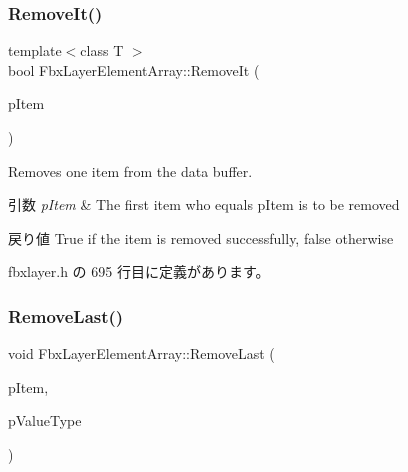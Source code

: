 \subsubsection{\texorpdfstring{Remove\+It()}{RemoveIt()}\hspace{0.1cm}{\footnotesize\ttfamily [2/2]}}
{\footnotesize\ttfamily template$<$class T $>$ \\
bool Fbx\+Layer\+Element\+Array\+::\+Remove\+It (\begin{DoxyParamCaption}\item[{T $\ast$}]{p\+Item }\end{DoxyParamCaption})\hspace{0.3cm}{\ttfamily [inline]}}

Removes one item from the data buffer. 
\begin{DoxyParams}{引数}
{\em p\+Item} & The first item who equals p\+Item is to be removed \\
\hline
\end{DoxyParams}
\begin{DoxyReturn}{戻り値}
{\ttfamily True} if the item is removed successfully, {\ttfamily false} otherwise 
\end{DoxyReturn}


 fbxlayer.\+h の 695 行目に定義があります。

\mbox{\label{class_fbx_layer_element_array_a928f848275334427d958c996e10e2535}} 
\subsubsection{\texorpdfstring{Remove\+Last()}{RemoveLast()}\hspace{0.1cm}{\footnotesize\ttfamily [1/2]}}
{\footnotesize\ttfamily void Fbx\+Layer\+Element\+Array\+::\+Remove\+Last (\begin{DoxyParamCaption}\item[{void $\ast$$\ast$}]{p\+Item,  }\item[{\hyperlink{fbxpropertytypes_8h_a73913a5ddfb20e57c6f25e9e6784bd92}{E\+Fbx\+Type}}]{p\+Value\+Type }\end{DoxyParamCaption})}

